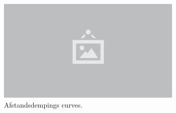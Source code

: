 \begin{figure}
  \centering
  \includegraphics[width=0.8\textwidth]{./img/raw/placeholder.png}
  \caption{Afstandsdempings curves.}
  \label{fig:pl-distance-attenuation}
\end{figure}
